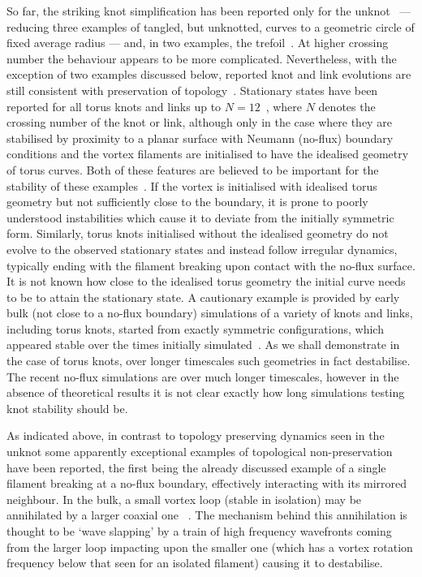 So far, the striking knot simplification has been reported only for the unknot~\citep{Maucher2016} --- reducing three examples of tangled, but unknotted, curves to a geometric circle of fixed average radius --- and, in two examples, the trefoil~\citep{Sutcliffe2003,Maucher2016}. At higher crossing number the behaviour appears to be more complicated. Nevertheless, with the exception of two examples discussed below, reported knot and link evolutions are still consistent with preservation of topology~\citep{Henze1993, Winfree1990, WinfreeChapter, Sutcliffe2003,Maucher2016,Maucher2017, Maucher2019}. Stationary states have been reported for all torus knots and links up to $N=12$~\citep{Maucher2017,Maucher2019}, where $N$ denotes the crossing number of the knot or link, although only in the case where they are stabilised by proximity to a planar surface with Neumann (no-flux) boundary conditions and the vortex filaments are initialised to have the idealised geometry of torus curves. Both of these features are believed to be important for the stability of these examples~\citep{Maucher2017,Maucher2019}. If the vortex is initialised with idealised torus geometry but not sufficiently close to the boundary, it is prone to poorly understood instabilities which cause it to deviate from the initially symmetric form. Similarly, torus knots initialised without the idealised geometry do not evolve to the observed stationary states and instead follow irregular dynamics, typically ending with the filament breaking upon contact with the no-flux surface. It is not known how close to the idealised torus geometry the initial curve needs to be to attain the stationary state. A cautionary example is provided by early bulk (not close to a no-flux boundary) simulations of a variety of knots and links, including torus knots, started from exactly symmetric configurations, which appeared stable over the times initially simulated~\citep{Henze1993}. As we shall demonstrate in the case of torus knots, over longer timescales such geometries in fact destabilise. The recent no-flux simulations are over much longer timescales, however in the absence of theoretical results it is not clear exactly how long simulations testing knot stability should be.

As indicated above, in contrast to topology preserving dynamics seen in the unknot some apparently exceptional examples of topological non-preservation have been reported, the first being the already discussed example of a single filament breaking at a no-flux boundary, effectively interacting with its mirrored neighbour. In the bulk, a small vortex loop (stable in isolation) may be annihilated by a larger coaxial one ~\citep{Courtemanche1990,Maucher2018}. The mechanism behind this annihilation is thought to be `wave slapping' by a train of high frequency wavefronts coming from the larger loop impacting upon the smaller one (which has a vortex rotation frequency below that seen for an isolated filament) causing it to destabilise. 


